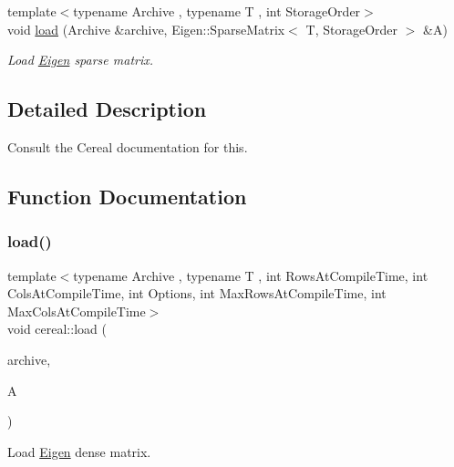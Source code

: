 \begin{DoxyCompactItemize}
{\footnotesize template$<$typename Archive , typename T , int Storage\+Order$>$ }\\void \hyperlink{namespacecereal_a6aff97cdc9835822d790cc0cec9ce12f}{load} (Archive \&archive, Eigen\+::\+Sparse\+Matrix$<$ T, Storage\+Order $>$ \&A)
\begin{DoxyCompactList}\small\item\em Load \hyperlink{namespaceEigen}{Eigen} sparse matrix. \end{DoxyCompactList}\end{DoxyCompactItemize}


\subsection{Detailed Description}
Consult the Cereal documentation for this. 

\subsection{Function Documentation}
\mbox{\label{namespacecereal_a62dfe53ce43ad27c02ca954e9da31dc5}} 
\subsubsection{\texorpdfstring{load()}{load()}\hspace{0.1cm}{\footnotesize\ttfamily [1/2]}}
{\footnotesize\ttfamily template$<$typename Archive , typename T , int Rows\+At\+Compile\+Time, int Cols\+At\+Compile\+Time, int Options, int Max\+Rows\+At\+Compile\+Time, int Max\+Cols\+At\+Compile\+Time$>$ \\
void cereal\+::load (\begin{DoxyParamCaption}\item[{Archive \&}]{archive,  }\item[{Eigen\+::\+Matrix$<$ T, Rows\+At\+Compile\+Time, Cols\+At\+Compile\+Time, Options, Max\+Rows\+At\+Compile\+Time, Max\+Cols\+At\+Compile\+Time $>$ \&}]{A }\end{DoxyParamCaption})}



Load \hyperlink{namespaceEigen}{Eigen} dense matrix. 

\mbox{\label{namespacecereal_a6aff97cdc9835822d790cc0cec9ce12f}} 
